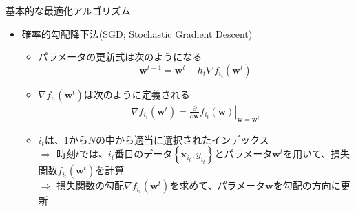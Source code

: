 \documentclass[dvipdfmx,notheorems,t]{beamer}
\begin{document}
\begin{frame}{基本的な最適化アルゴリズム}

\begin{itemize}
	\item 確率的勾配降下法(SGD; Stochastic Gradient Descent)
	\begin{itemize}
		\item パラメータの更新式は次のようになる
		\begin{equation}
			\bm{w}^{t + 1} = \bm{w}^t - h_t \nabla f_{i_t}(\bm{w}^t)
		\end{equation}
		
		\item $\nabla f_{i_t}(\bm{w}^t)$は次のように定義される
		\begin{eqnarray}
			\nabla f_{i_t}(\bm{w}^t) = \left. \frac{\partial}{\partial \bm{w}} f_{i_t}(\bm{w}) \right|_{\bm{w} = \bm{w}^t}
		\end{eqnarray}
		
		\item $i_t$は、$1$から$N$の中から適当に選択されたインデックス \\
		$\Rightarrow$ 時刻$t$では、$i_t$番目のデータ$\left\{ \bm{x}_{i_t}, y_{i_t} \right\}$とパラメータ$\bm{w}^t$を用いて、損失関数$f_{i_t}(\bm{w}^t)$を計算 \\
		$\Rightarrow$ 損失関数の勾配$\nabla f_{i_t}(\bm{w}^t)$を求めて、パラメータ$\bm{w}$を勾配の方向に更新
	\end{itemize}
\end{itemize}

\end{frame}
\end{document}
